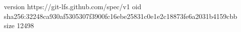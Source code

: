 version https://git-lfs.github.com/spec/v1
oid sha256:32248ca930af5305307f3900fc16ebe25831c0e1e2c18873fe6a2031b4159cbb
size 12498
